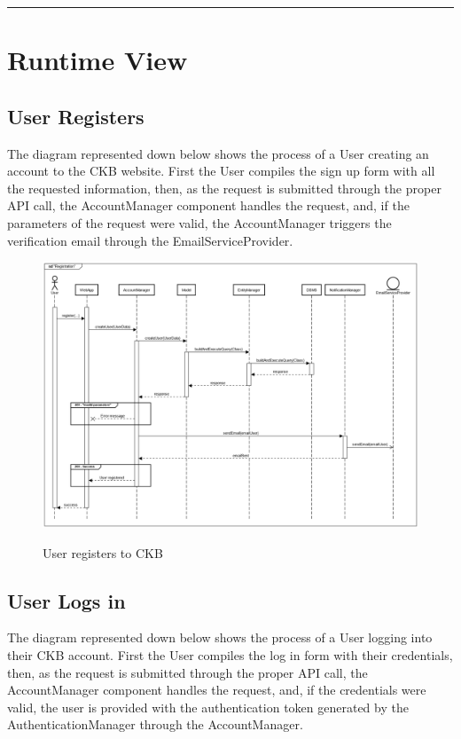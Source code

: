 \documentclass{Configuration_Files/Template}
\begin{document}
{\color{bluepoli}\rule{\linewidth}{0.1pt}}

\section{Runtime View}

\subsection{User Registers}

The diagram represented down below shows the process of a User creating an account to the CKB website. First the User compiles the sign up form with all the requested information, then, as the request is submitted through the proper API call, the AccountManager component handles the request, and, if the parameters of the request were valid, the AccountManager triggers the verification email through the EmailServiceProvider.

\begin{figure}[H]
\centering
\includegraphics[scale = 0.33]{Images/diagrams/sequences/UserRegisters.png}\\
\caption{User registers to CKB}
\end{figure}

\subsection{User Logs in}

The diagram represented down below shows the process of a User logging into their CKB account. First the User compiles the log in form with their credentials, then, as the request is submitted through the proper API call, the AccountManager component handles the request, and, if the credentials were valid, the user is provided with the authentication token generated by the AuthenticationManager through the AccountManager.
\end{document}
